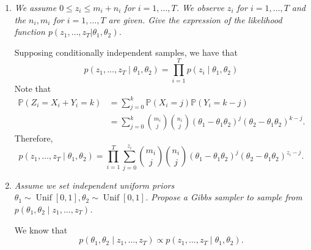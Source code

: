 \documentclass[a4paper,12pt]{article}
\newcommand{\unif}{\operatorname{Unif}}
\newcommand{\pr}{\mathbb{P}}
\theoremstyle{definition}
\begin{document}
\begin{enumerate}
    \item {\it We assume $0 \le z_i \le m_i + n_i$ for $i = 1, \dots , T$. We
    observe $z_i$ for $i = 1,\dots, T$ and the $n_i , m_i$ for
    $i = 1, \dots, T$ are given. Give the expression of the likelihood
    function $p(z_1, \dots, z_T| \theta_1, \theta_2)$.}
    
    Supposing conditionally independent samples, we have that 
    $$
    p(z_1, \dots, z_T \mid \theta_1, \theta_2) = \prod_{i=1}^T p(z_i\mid \theta_1, \theta_2)
    $$
    Note that 
    \begin{equation*}
        \begin{split}
            \pr(Z_i = X_i + Y_i = k) &= \sum_{j=0}^k \pr(X_i = j)\pr(Y_i = k-j) \\
            &= \sum_{j=0}^k \binom{m_i}{j}\binom{n_i}{j} (\theta_1-\theta_1\theta_2)^j(\theta_2-\theta_1\theta_2)^{k-j}. 
        \end{split}
    \end{equation*}
    Therefore, 
    $$
    p(z_1, \dots, z_T \mid \theta_1, \theta_2) = \prod_{i=1}^T \sum_{j=0}^{z_i} \binom{m_i}{j}\binom{n_i}{j} (\theta_1-\theta_1\theta_2)^j(\theta_2-\theta_1\theta_2)^{z_i-j}.
    $$

    \item {\it Assume we set independent uniform priors $\theta_1 \sim
    \unif[0,1], \theta_2 \sim \unif[0,1]$. Propose a Gibbs sampler to sample from $p( \theta_1 , \theta_2 \mid z_1 , \dots, z_T)$.}
    
    We know that 
    $$
    p( \theta_1 , \theta_2 \mid z_1 , \dots, z_T) \propto p(z_1, \dots, z_T \mid \theta_1, \theta_2).    
    $$

\end{enumerate}

% 
% 
\end{document}
